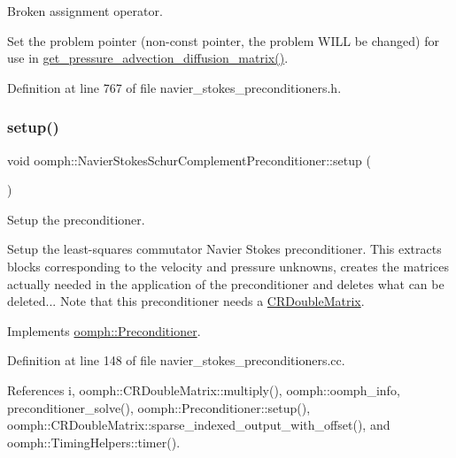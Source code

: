 Broken assignment operator. 

Set the problem pointer (non-\/const pointer, the problem W\+I\+LL be changed) for use in \hyperlink{classoomph_1_1NavierStokesSchurComplementPreconditioner_ac3f40f62d33d33616cdb4bed48aaccde}{get\+\_\+pressure\+\_\+advection\+\_\+diffusion\+\_\+matrix()}. 

Definition at line 767 of file navier\+\_\+stokes\+\_\+preconditioners.\+h.

\mbox{\label{classoomph_1_1NavierStokesSchurComplementPreconditioner_a03cbfa527081ea03c910aadc281615d7}} 
\subsubsection{\texorpdfstring{setup()}{setup()}}
{\footnotesize\ttfamily void oomph\+::\+Navier\+Stokes\+Schur\+Complement\+Preconditioner\+::setup (\begin{DoxyParamCaption}{ }\end{DoxyParamCaption})\hspace{0.3cm}{\ttfamily [virtual]}}



Setup the preconditioner. 

Setup the least-\/squares commutator Navier Stokes preconditioner. This extracts blocks corresponding to the velocity and pressure unknowns, creates the matrices actually needed in the application of the preconditioner and deletes what can be deleted... Note that this preconditioner needs a \hyperlink{classoomph_1_1CRDoubleMatrix}{C\+R\+Double\+Matrix}. 

Implements \hyperlink{classoomph_1_1Preconditioner_af4886f4efe510e5c9b0eb19422943588}{oomph\+::\+Preconditioner}.



Definition at line 148 of file navier\+\_\+stokes\+\_\+preconditioners.\+cc.



References i, oomph\+::\+C\+R\+Double\+Matrix\+::multiply(), oomph\+::oomph\+\_\+info, preconditioner\+\_\+solve(), oomph\+::\+Preconditioner\+::setup(), oomph\+::\+C\+R\+Double\+Matrix\+::sparse\+\_\+indexed\+\_\+output\+\_\+with\+\_\+offset(), and oomph\+::\+Timing\+Helpers\+::timer().



